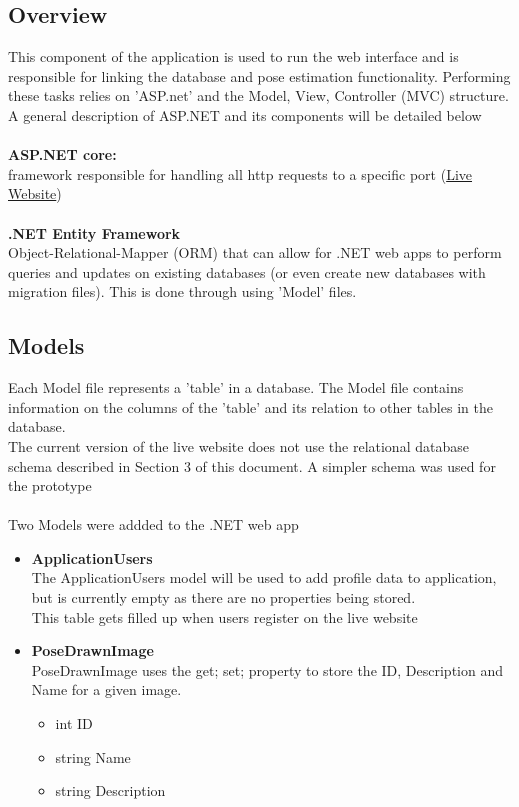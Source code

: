\documentclass{scrreprt}
\begin{document}
\subsection{Overview}
This component of the application is used to run the web interface and is responsible for linking the database and pose estimation functionality. Performing these tasks relies on 'ASP.net' and the Model, View, Controller (MVC) structure. A general description of ASP.NET and its components will be detailed below
\\\\
\textbf{ASP.NET core:}
\\
framework responsible for handling all http requests to a specific port (\href{159.203.10.112}{Live Website})
\\\\
\textbf{.NET Entity Framework}
\\Object-Relational-Mapper (ORM) that can allow for .NET web apps to perform queries and updates on existing databases (or even create new databases with migration files). This is done through using 'Model' files.

\subsection{Models}

Each Model file represents a 'table' in a database. The Model file contains information on the columns of the 'table' and its relation to other tables in the database.
\\
The current version of the live website does not use the relational database schema described in Section 3 of this document. A simpler schema was used for the prototype
\\\\
Two Models were addded to the .NET web app

    \begin{itemize}
      \item \textbf{ApplicationUsers}
      \\
      The ApplicationUsers model will be used to add profile data to application, but is currently empty as there are no properties being stored.
      \\
      This table gets filled up when users register on the live website

      \item \textbf{PoseDrawnImage}
      \\
      PoseDrawnImage uses the {get; set;} property to store the ID, Description and Name for a given image.

      \begin{itemize}
        \item int ID
        \item string Name
        \item string Description
      \end{itemize}

    \end{itemize}
\end{document}
